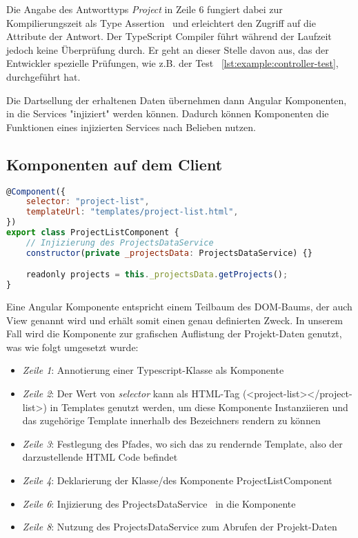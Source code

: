 Die Angabe des Antworttyps \emph{Project} in Zeile 6 fungiert dabei zur Kompilierungszeit als Type Assertion~\cite{typescript-typeassertion}
und erleichtert den Zugriff auf die Attribute der Antwort. Der TypeScript Compiler führt während der Laufzeit jedoch keine Überprüfung durch.
Er geht an dieser Stelle davon aus, das der Entwickler spezielle Prüfungen, wie z.B. der Test ~\ref{lst:example:controller-test}, durchgeführt hat.

Die Dartsellung der erhaltenen Daten übernehmen dann Angular Komponenten, in die Services "injiziert" werden können.
Dadurch können Komponenten die Funktionen eines injizierten Services nach Belieben nutzen.

\subsection{Komponenten auf dem Client}
\label{sec:requirements:example:component}

\begin{lstlisting}[language=JavaScript,float=h!,caption={Funktion zum Abruf aller Projekte vom Server}, label={lst:example:service}]
@Component({
    selector: "project-list",
    templateUrl: "templates/project-list.html",
})
export class ProjectListComponent {
    // Injizierung des ProjectsDataService
    constructor(private _projectsData: ProjectsDataService) {}

    readonly projects = this._projectsData.getProjects();
}
\end{lstlisting}
Eine Angular Komponente entspricht einem Teilbaum des DOM-Baums, der auch View genannt wird und erhält somit einen genau definierten Zweck.
In unserem Fall wird die Komponente zur grafischen Auflistung der Projekt-Daten genutzt, was wie folgt umgesetzt wurde:

\begin{itemize}
    \setlength\itemsep{-1em}
    \item \emph{Zeile 1}: Annotierung einer Typescript-Klasse als Komponente
    \item \emph{Zeile 2}: Der Wert von \emph{selector} kann als HTML-Tag (<project-list></project-list>) in Templates genutzt werden,
    um diese Komponente Instanziieren und das zugehörige Template innerhalb des Bezeichners rendern zu können
    \item \emph{Zeile 3}: Festlegung des Pfades, wo sich das zu rendernde Template, also der darzustellende HTML Code befindet
    \item \emph{Zeile 4}: Deklarierung der Klasse/des Komponente ProjectListComponent
    \item \emph{Zeile 6}: Injizierung des ProjectsDataService~\cite{angular-http} in die Komponente
    \item \emph{Zeile 8}: Nutzung des ProjectsDataService zum Abrufen der Projekt-Daten
\end{itemize}

